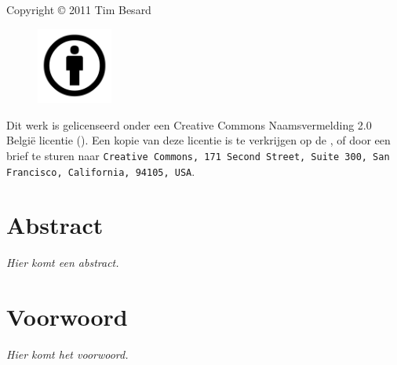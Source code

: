 %
%

\maketitle


%
%

\null
\vfill

Copyright © 2011 Tim Besard

\vspace{1cm}

\begin{figure}
\vspace{-10pt}
\centering
\includegraphics[width=2.5cm]{afbeeldingen/creative-commons-by}
\end{figure}

\noindent \nohyphens{Dit werk is gelicenseerd onder een Creative Commons Naamsvermelding 2.0 België licentie (). Een kopie van deze licentie is te verkrijgen op de , of door een brief te sturen naar \texttt{Creative Commons, 171 Second Street, Suite 300, San Francisco, California, 94105, USA}}.


%
%

\chapter*{Abstract}

\textit{Hier komt een abstract.}


%
%

\chapter*{Voorwoord}

\textit{Hier komt het voorwoord.}


%
%

\setlength\cftpartnumwidth{2em}

\newpage
\tableofcontents

\newpage


